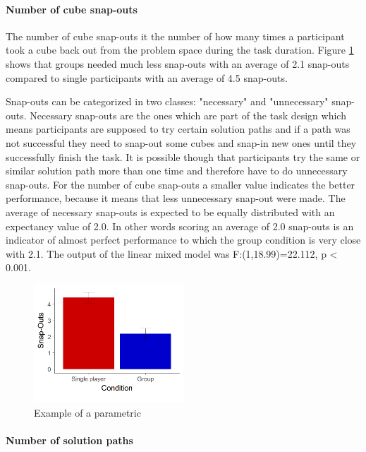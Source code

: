 \documentclass{article}
\begin{document}
\paragraph{Number of cube snap-outs}
The number of cube snap-outs it the number of how many times a participant took a cube back out from the problem space during the task duration. Figure \ref{fig:results_snap_outs} shows that groups needed much less snap-outs with an average of 2.1 snap-outs compared to single participants with an average of 4.5 snap-outs. 

Snap-outs can be categorized in two classes: "necessary" and "unnecessary" snap-outs. Necessary snap-outs are the ones which are part of the task design which means participants are supposed to try certain solution paths and if a path was not successful they need to snap-out some cubes and snap-in new ones until they successfully finish the task. It is possible though that participants try the same or similar solution path more than one time and therefore have to do unnecessary snap-outs. For the number of cube snap-outs a smaller value indicates the better performance, because it means that less unnecessary snap-out were made. The average of necessary snap-outs is expected to be equally distributed with an expectancy value of 2.0. In other words scoring an average of 2.0 snap-outs is an indicator of almost perfect performance to which the group condition is very close with 2.1.
The output of the linear mixed model was F:(1,18.99)=22.112, p < 0.001.

\begin{figure}[h]
\centering
\includegraphics[width=0.5\textwidth]{results_snap_outs}
\caption{Example of a parametric }
\label{fig:results_snap_outs}
\end{figure}

\paragraph{Number of solution paths}
\end{document}
